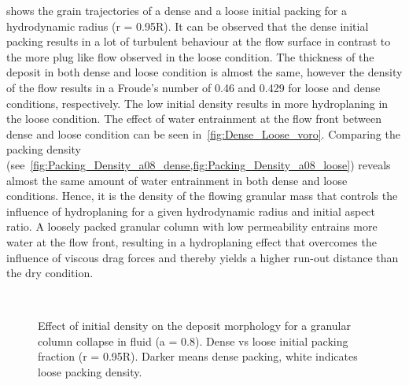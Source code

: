  shows the grain trajectories of a dense and a loose 
initial packing for a hydrodynamic radius (r = 0.95R). It can be observed that 
the dense initial packing results in a lot of turbulent behaviour at the flow 
surface in contrast to the more plug like flow observed in the loose condition. 
The thickness of the deposit in both dense and loose condition is almost the 
same, however the density of the flow results in a Froude's number of 0.46 and
0.429 for loose and dense conditions, respectively. The low initial density 
results in more hydroplaning in the loose condition. The effect of water 
entrainment at the flow front between dense and loose condition can be seen 
in~\cref{fig:Dense_Loose_voro}. Comparing the packing density 
(see~\cref{fig:Packing_Density_a08_dense,fig:Packing_Density_a08_loose}) 
reveals almost the same amount of water entrainment in both dense and loose 
conditions. Hence, it is the density of the flowing granular mass that controls 
the influence of hydroplaning for a given hydrodynamic radius and initial 
aspect ratio. A loosely packed granular column with low permeability entrains 
more water at the flow front, resulting in a hydroplaning effect that overcomes 
the influence of viscous drag forces and thereby yields a higher run-out 
distance than the dry condition.

\begin{figure}
\centering
{}\\
\caption{Effect of initial density on the deposit morphology
for a granular column collapse in fluid (a = 0.8). Dense vs loose initial 
packing fraction (r = 0.95R). Darker means dense packing, white indicates loose 
packing density.}
\label{fig:Dense_Loose_PT}
\end{figure}


